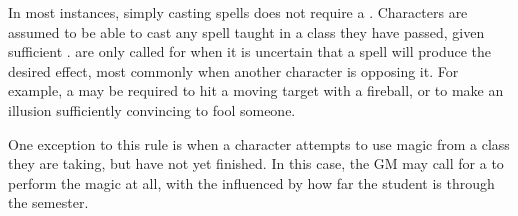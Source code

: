 In most instances, simply casting spells does not require a {\test}.
Characters are assumed to be able to cast any spell taught in a class they have passed, given sufficient {\focus}.
\capital{\tests} are only called for when it is uncertain that a spell will produce the desired effect, most commonly when another character is opposing it.
For example, a {\test} may be required to hit a moving target with a fireball, or to make an illusion sufficiently convincing to fool someone.

One exception to this rule is when a character attempts to use magic from a class they are taking, but have not yet finished.
In this case, the GM may call for a {\test} to perform the magic at all, with the {\tn} influenced by how far the student is through the semester.
